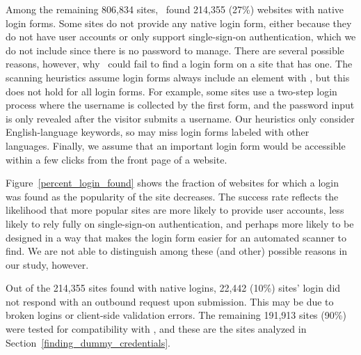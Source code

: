  Among the remaining 806,834 sites, \SwapScan\ found 214,355 (27\%) websites with native login forms. Some sites do not provide any native login form, either because they do not have user accounts or only support single-sign-on authentication, which we do not include since there is no password to manage.  
There are several possible reasons, however, why \SwapScan\ could fail to find a login form on a site that has one.  The scanning heuristics assume login forms always include an element with , but this does not hold for all login forms. For example, some sites use a two-step login process where the username is collected by the first form, and the password input is only revealed after the visitor submits a username.
Our heuristics only consider English-language keywords, so may miss login forms labeled with other languages. Finally, we assume that an important login form would be accessible within a few clicks from the front page of a website. 

Figure~\ref{percent_login_found} shows the fraction of websites for which a login was found as the popularity of the site decreases.  The success rate reflects the likelihood that more popular sites are more likely to provide user accounts, less likely to rely fully on single-sign-on authentication, and perhaps more likely to be designed in a way that makes the login form easier for an automated scanner to find. We are not able to distinguish among these (and other) possible reasons in our study, however.

Out of the 214,355 sites found with native logins, 22,442 (10\%) sites' login did not respond with an outbound request upon submission. This may be due to broken logins or client-side validation errors.  The remaining 191,913 sites (90\%) were tested for compatibility with \SecPass, and these are the sites analyzed in Section~\ref{finding_dummy_credentials}.

